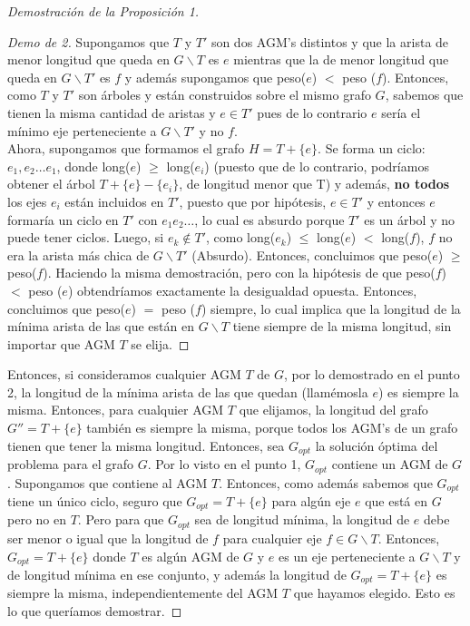 \documentclass[11pt, a4paper, twoside]{article}
\begin{document}
\begin{proof}[Demostración de la Proposición 1]
\begin{enumerate}
        \begin{proof}[Demo de 2]
		Supongamos que $T$ y $T'$ son dos AGM's distintos y que la arista de menor longitud 
		que queda en $G \backslash T$ es $e$ mientras que la de menor longitud que queda en
		$G \backslash T'$ es $f$ y además supongamos que peso($e$) $<$ peso ($f$). Entonces,
		como $T$ y $T'$ son árboles y están construidos sobre el mismo grafo $G$, sabemos que
		tienen la misma cantidad de aristas y $e \in T'$ pues de lo contrario $e$ sería el mínimo
		eje perteneciente a $G \backslash T'$ y no $f$.\\
		Ahora, supongamos que formamos el grafo 
		$H = T + \{e\}$. Se forma un ciclo: $e_{1}, e_{2} \dots e_{1}$, donde long($e$) $\geq$ 
		long($e_{i}$) (puesto que de lo contrario, podríamos obtener el árbol $T + \{e\} - \{e_{i}\}$, de 
		longitud menor que T) y además, \textbf{no todos} 
		los ejes $e_{i}$ están incluidos en $T'$, puesto que por hipótesis, $e \in T'$ y entonces
		$e$ formaría un ciclo en $T'$ con $e_{1} e_{2} \dots$, lo cual es absurdo porque $T'$ es un
		árbol y no puede tener ciclos.
		Luego, si $e_{k} \not\in T'$, como long($e_{k}$) $\leq$ long($e$) $<$ long($f$), $f$ no 
		era la arista más chica de $G \backslash T'$ (Absurdo). Entonces, concluimos que 
		peso($e$) $\geq$ peso($f$). Haciendo la misma demostración, pero con la hipótesis de que
		peso($f$) $<$ peso ($e$) obtendríamos exactamente la desigualdad opuesta. 
		Entonces, concluimos que peso($e$) $=$ peso ($f$) siempre, lo cual implica que 
		la longitud de la mínima arista de las que están en $G \backslash T$ tiene siempre de 
		la misma longitud, sin importar que AGM $T$ se elija.
		\end{proof}
\end{enumerate}
Entonces, si consideramos cualquier AGM $T$ de $G$, por lo demostrado en el punto 2, la
longitud de la mínima arista de las que quedan (llamémosla $e$) es siempre la misma.
Entonces, para cualquier AGM $T$ que elijamos, la longitud del grafo $ G'' = T + \{e\} $
también es siempre la misma, porque todos los AGM's de un grafo tienen que tener la misma
longitud. Entonces, sea $G_{opt}$ la solución óptima del problema para el grafo $G$. 
Por lo visto en el punto 1, $G_{opt}$ contiene un AGM de $G$. Supongamos que contiene 
al AGM $T$. Entonces, como además sabemos que $G_{opt}$ tiene un único ciclo, seguro que
$G_{opt} = T + \{e\}$ para algún eje $e$ que está en $G$ pero no en $T$. Pero para que 
$G_{opt}$ sea de longitud mínima, la longitud de $e$ debe ser menor o igual que la 
longitud de $f$ para cualquier eje $f \in G \backslash T$. Entonces, 
$G_{opt} = T + \{e\}$ donde $T$ es algún AGM de $G$ y $e$ es un eje perteneciente a
$G \backslash T$ y de longitud mínima en ese conjunto, y además la longitud de
$G_{opt} = T + \{e\}$ es siempre la misma, independientemente del AGM $T$ que hayamos
elegido. Esto es lo que queríamos demostrar.
\end{proof}
\end{document}
